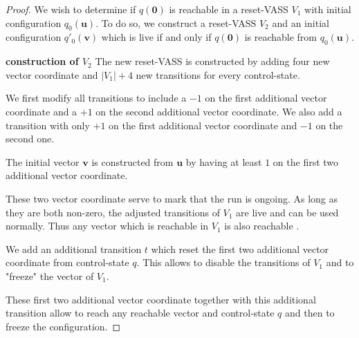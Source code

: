 \begin{proof}


We wish to determine if $q(\textbf{0})$ is reachable in a reset-VASS $V_1$
with
initial configuration $q_0(\textbf{u})$.
To do so, we construct a reset-VASS $V_2$
and an initial configuration $q'_0(\textbf{v})$ 
which is live if and only if 
$q(\textbf{0})$
is reachable from $q_0(\textbf{u})$.

{\bf construction of $V_2$}
The new reset-VASS is constructed by adding four new vector coordinate
and
$|V_1|+4$ new transitions for every control-state.

We first modify all transitions to include a $-1$ on the first additional vector coordinate and a $+1$ on the second additional vector coordinate. We also add a transition with only $+1$ on the first additional vector coordinate and $-1$ on the second one.



The initial vector $\textbf{v}$ is constructed from $\textbf{u}$ by having at least $1$ on the first two additional vector coordinate.


These two vector coordinate serve to mark that the run is ongoing. As long as they are both non-zero, the adjusted transitions of $V_1$ are live and can be used normally. Thus any vector which is reachable in $V_1$ is also reachable%
.



We add an additional transition $t$ %
which reset the first two additional vector coordinate from control-state $q$.
This allows to disable the transitions of $V_1$ and to "freeze" the vector of $V_1$.

These first two additional vector coordinate together with this additional transition allow
to reach any reachable vector and control-state $q$ and then to freeze the configuration.


\end{proof}
